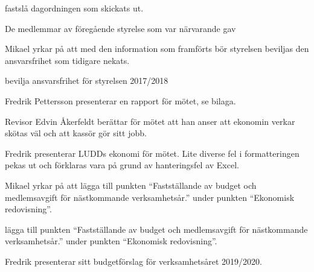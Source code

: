 \documentclass{protokoll}
\begin{document}
\newpage  


\begin{beslut}
     \att fastslå dagordningen som skickats ut.
\end{beslut}

De medlemmar av föregående styrelse som var närvarande gav 

Mikael yrkar på att med den information som framförts bör styrelsen beviljas
den ansvarsfrihet som tidigare nekats. 

\begin{beslut}
  \att bevilja ansvarsfrihet för styrelsen 2017/2018
\end{beslut}

Fredrik Pettersson presenterar en rapport för mötet, se bilaga.

Revisor Edvin Åkerfeldt berättar för mötet att han anser att ekonomin verkar
skötas väl och att kassör gör sitt jobb. 

Fredrik presenterar LUDDs ekonomi för mötet. 
Lite diverse fel i formatteringen pekas ut och förklaras vara på grund av
hanteringsfel av Excel. 

Mikael yrkar på att lägga till punkten ``Fastställande av budget och medlemsavgift för nästkommande
verksamhetsår.'' under punkten ``Ekonomisk redovisning''. 
\begin{beslut}
\att lägga till punkten ``Fastställande av budget och medlemsavgift för nästkommande
verksamhetsår.'' under punkten ``Ekonomisk redovisning''.
\end{beslut}
Fredrik presenterar sitt budgetförslag för verksamhetsåret 2019/2020.
\end{document}
